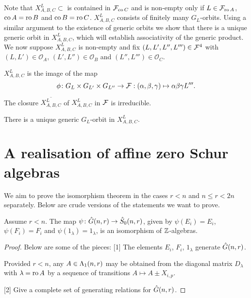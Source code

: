 \documentclass[a4paper, 11pt]{report}
\begin{document}
Note that $X_{A,B,C}^L\subset$ is contained in $\mathcal{F}_{\operatorname{co}{C}}$ and is non-empty only if $L\in\mathcal{F}_{\operatorname{ro}{A}}$, $\operatorname{co}{A}=\operatorname{ro}{B}$ and $\operatorname{co}{B}=\operatorname{ro}{C}$. $X_{A,B,C}^L$ consists of finitely many $G_L$-orbits. Using a similar argument to the existence of generic orbits we show that there is a unique generic orbit in $X_{A,B,C}^L$, which will establish associativity of the generic product. We now suppose $X_{A,B,C}^L$ is non-empty and fix $(L,L',L'',L''')\in\mathcal{F}^4$ with $(L,L')\in\mathcal{O}_A$, $(L',L'')\in\mathcal{O}_B$ and $(L'',L''')\in\mathcal{O}_C$.

\begin{lemma}
$X_{A,B,C}^L$ is the image of the map
\begin{equation*}
\phi\colon G_L\times G_{L'}\times G_{L''}\to \mathcal{F}: (\alpha,\beta,\gamma)\mapsto \alpha\beta\gamma L'''.
\end{equation*}
\end{lemma}

\begin{proposition}
The closure $\overline{X_{A,B,C}^L}$ of $X_{A,B,C}^L$ in $\mathcal{F}$ is irreducible.
\end{proposition}

\begin{proposition}
There is a unique generic $G_L$-orbit in $X_{A,B,C}^L$.
\end{proposition}

\chapter{A realisation of affine zero Schur algebras}

We aim to prove the isomorphism theorem in the cases $r<n$ and $n\le r< 2n$ separately. Below are crude versions of the statements we want to prove.

\begin{theorem}
Assume $r<n$. The map $\psi\colon\hat{G}(n,r)\to\hat{S}_0(n,r)$, given by $\psi(E_i)=E_i$, $\psi(F_i
)=F_i$ and $\psi(1_\lambda) = 1_\lambda$, is an isomorphism of $\mathbb{Z}$-algebras.
\end{theorem}
\begin{proof}{\color{gray}
Below are some of the pieces:
[1] The elements $E_i$, $F_i$, $1_\lambda$ generate $\hat{G}(n,r)$.

Provided $r<n$, any $A\in\Lambda_1(n,r)$ may be obtained from the diagonal matrix $D_\lambda$ with $\lambda=\operatorname{ro}{A}$ by a sequence of transitions $A \mapsto A\pm X_{i,p}$.

[2] Give a complete set of generating relations for $\hat{G}(n,r)$.}
\end{proof}
\end{document}
